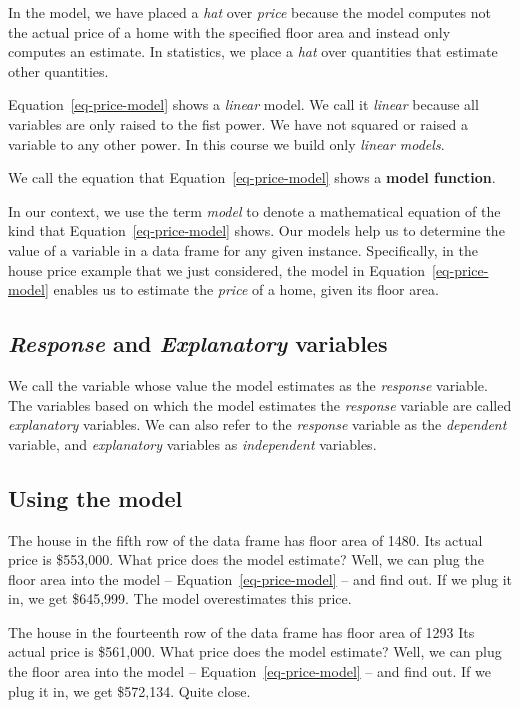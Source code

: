 \documentclass[
  12pt,
  letterpaper,
  DIV=11,
  numbers=noendperiod]{scrreprt}
\begin{document}
In the model, we have placed a \emph{hat} over \emph{price} because the
model computes not the actual price of a home with the specified floor
area and instead only computes an estimate. In statistics, we place a
\emph{hat} over quantities that estimate other quantities.

Equation~\ref{eq-price-model} shows a \emph{linear} model. We call it
\emph{linear} because all variables are only raised to the fist power.
We have not squared or raised a variable to any other power. In this
course we build only \emph{linear models}.

We call the equation that Equation~\ref{eq-price-model} shows a
\textbf{model function}.

In our context, we use the term \emph{model} to denote a mathematical
equation of the kind that Equation~\ref{eq-price-model} shows. Our
models help us to determine the value of a variable in a data frame for
any given instance. Specifically, in the house price example that we
just considered, the model in Equation~\ref{eq-price-model} enables us
to estimate the \emph{price} of a home, given its floor area.

\subsection{\texorpdfstring{\emph{Response} and \emph{Explanatory}
variables}{Response and Explanatory variables}}\label{response-and-explanatory-variables}

We call the variable whose value the model estimates as the
\emph{response} variable. The variables based on which the model
estimates the \emph{response} variable are called \emph{explanatory}
variables. We can also refer to the \emph{response} variable as the
\emph{dependent} variable, and \emph{explanatory} variables as
\emph{independent} variables.

\subsection{Using the model}\label{using-the-model}

The house in the fifth row of the data frame has floor area of 1480. Its
actual price is \$553,000. What price does the model estimate? Well, we
can plug the floor area into the model -- Equation~\ref{eq-price-model}
-- and find out. If we plug it in, we get \$645,999. The model
overestimates this price.

The house in the fourteenth row of the data frame has floor area of 1293
Its actual price is \$561,000. What price does the model estimate? Well,
we can plug the floor area into the model --
Equation~\ref{eq-price-model} -- and find out. If we plug it in, we get
\$572,134. Quite close.
\end{document}
